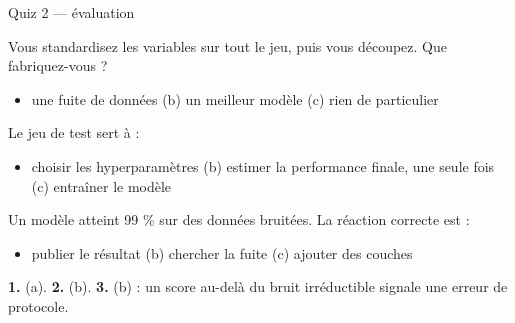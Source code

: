 \begin{frame}{Quiz 2 --- évaluation}
\begin{qbox}[Question 1]
Vous standardisez les variables sur tout le jeu, puis vous découpez. Que
fabriquez-vous ?
\begin{itemize}
  \item[(a)] une fuite de données \quad (b) un meilleur modèle \quad
  (c) rien de particulier
\end{itemize}
\end{qbox}
\begin{qbox}[Question 2]
Le jeu de test sert à :
\begin{itemize}
  \item[(a)] choisir les hyperparamètres \quad (b) estimer la performance
  finale, une seule fois \quad (c) entraîner le modèle
\end{itemize}
\end{qbox}
\begin{qbox}[Question 3]
Un modèle atteint 99 \% sur des données bruitées. La réaction correcte est :
\begin{itemize}
  \item[(a)] publier le résultat \quad (b) chercher la fuite \quad
  (c) ajouter des couches
\end{itemize}
\end{qbox}
\begin{solbox}[Réponses]
\textbf{1.} (a). \quad \textbf{2.} (b). \quad \textbf{3.} (b) : un score
au-delà du bruit irréductible signale une erreur de protocole.
\end{solbox}
\end{frame}
